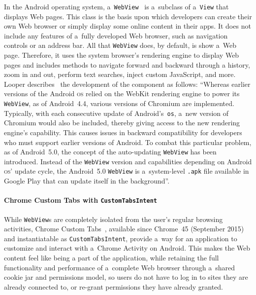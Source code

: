 \documentclass[sigconf]{acmart}
\begin{document}
In the Android operating system, a~\texttt{WebView}~\cite{android2018webview}
is a~subclass of a~\texttt{View} that displays Web pages.
This class is the basis upon which developers can create their own Web browser
or simply display some online content in their apps.
It does not include any features of a~fully developed Web browser,
such as navigation controls or an address bar.
All that \texttt{WebView} does, by default, is show a~Web page.
Therefore, it uses the system browser's rendering engine to display Web pages
and includes methods to navigate forward and backward through a history,
zoom in and out, perform text searches, inject custom JavaScript, and more.
Looper describes~\cite{looper2015webviews}
the development of the component as follows:
``Whereas earlier versions of the Android \textsc{os}
relied on the WebKit rendering engine to power its \texttt{WebView},
as of Android~4.4, various versions of Chromium are implemented.
Typically, with each consecutive update of Android's~\texttt{os},
a~new version of Chromium would also be included, thereby giving access
to the new rendering engine's capability.
This causes issues in backward compatibility for developers
who must support earlier versions of Android.
To combat this particular problem, as of Android~5.0,
the concept of the auto-updating \texttt{WebView} has been introduced.
Instead of the \texttt{WebView} version and capabilities
depending on Android \textsc{os}' update cycle,
the Android~5.0 \texttt{WebView} is a~system-level \texttt{.apk} file
available in Google Play that can update itself in the background''.

\paragraph{Chrome Custom Tabs with \texttt{CustomTabsIntent}}

While \texttt{WebView}s are completely isolated from the user's regular browsing activities,
Chrome Custom Tabs~\cite{kinlan2016customtabs}, available since Chrome~45 (September 2015)
and instantiatable as \texttt{CustomTabsIntent}, provide a~way for an application
to customize and interact with a~Chrome Activity on Android.
This makes the Web content feel like being a part of the application,
while retaining the full functionality and performance of a~complete Web browser
through a~shared cookie jar and permissions model, so users do not have to log in
to sites they are already connected to, or re-grant permissions they have already granted.
\end{document}
